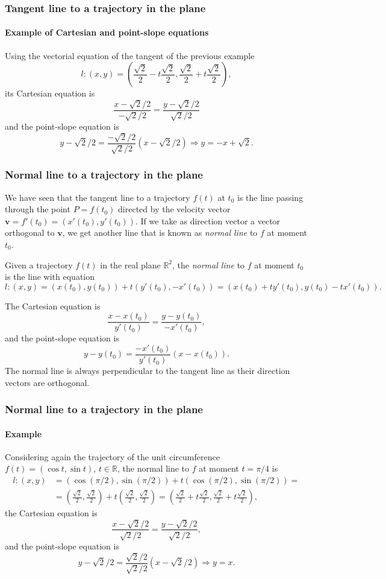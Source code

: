 \begin{frame}
\frametitle{Tangent line to a trajectory in the plane}
\framesubtitle{Example of Cartesian and point-slope equations}
Using the vectorial equation of the tangent of the previous example
\[
l: (x,y)=\left(\frac{\sqrt{2}}{2}-t\frac{\sqrt{2}}{2},\frac{\sqrt{2}}{2}+t\frac{\sqrt{2}}{2}\right),
\]
its Cartesian equation is 
\[
\frac{x-\sqrt{2}/2}{-\sqrt{2}/2} = \frac{y-\sqrt{2}/2}{\sqrt{2}/2}
\]
and the point-slope equation is 
\[
y-\sqrt{2}/2 = \frac{-\sqrt{2}/2}{\sqrt{2}/2}(x-\sqrt{2}/2) \Rightarrow y=-x+\sqrt{2}.
\]
\end{frame}


\begin{frame}
\frametitle{Normal line to a trajectory in the plane}
We have seen that the tangent line to a trajectory $f(t)$ at $t_0$ is the line passing through the point 
$P=f(t_0)$ directed by the velocity vector $\mathbf{v}=f'(t_0)=(x'(t_0),y'(t_0))$. 
If we take as direction vector a vector orthogonal to $\mathbf{v}$, we get another line that is known as \emph{normal line} to $f$ at moment $t_0$.
\begin{definition}
Given a trajectory $f(t)$ in the real plane $\mathbb{R}^2$, the \emph{normal line} to $f$ at moment $t_0$ is the line with equation
\[
l: (x,y)=(x(t_0),y(t_0))+t(y'(t_0),-x'(t_0)) = (x(t_0)+ty'(t_0),y(t_0)-tx'(t_0)).
\]
\end{definition}
The Cartesian equation is 
\[
\frac{x-x(t_0)}{y'(t_0)} = \frac{y-y(t_0)}{-x'(t_0)},
\]
and the point-slope equation is
\[
y-y(t_0) = \frac{-x'(t_0)}{y'(t_0)}(x-x(t_0)).
\]
The normal line is always perpendicular to the tangent line as their direction vectors are orthogonal. 
\end{frame}


\begin{frame}
\frametitle{Normal line to a trajectory in the plane}
\framesubtitle{Example}
Considering again the trajectory of the unit circumference $f(t) = (\cos t,\sin t)$, $t\in \mathbb{R}$, the normal line to $f$ at moment $t=\pi/4$ is
\begin{align*}
l: (x,y)&=(\cos(\pi/2),\sin(\pi/2))+t(\cos(\pi/2),\sin(\pi/2)) =\\
&= \left(\frac{\sqrt{2}}{2},\frac{\sqrt{2}}{2}\right)+t\left(\frac{\sqrt{2}}{2},\frac{\sqrt{2}}{2}\right)
=\left(\frac{\sqrt{2}}{2}+t\frac{\sqrt{2}}{2},\frac{\sqrt{2}}{2}+t\frac{\sqrt{2}}{2}\right),
\end{align*}
the Cartesian equation is 
\[
\frac{x-\sqrt{2}/2}{\sqrt{2}/2} = \frac{y-\sqrt{2}/2}{\sqrt{2}/2},
\]
and the point-slope equation is 
\[
y-\sqrt{2}/2 = \frac{\sqrt{2}/2}{\sqrt{2}/2}(x-\sqrt{2}/2) \Rightarrow y=x.
\]
\end{frame}


